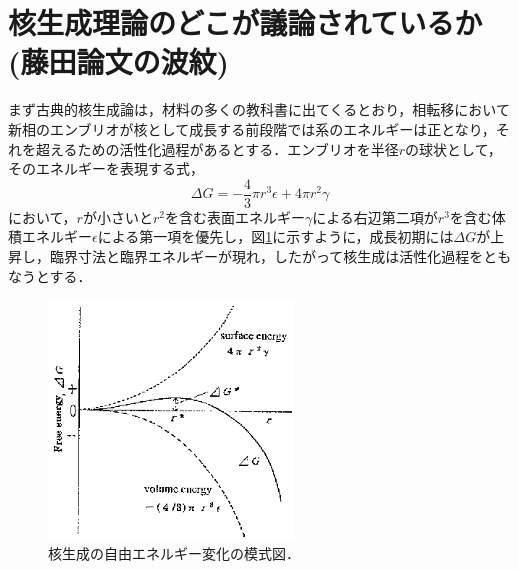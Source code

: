 \documentclass[a4j,10pt]{jarticle}
\begin{document}
\section{核生成理論のどこが議論されているか(藤田論文の波紋)}
まず古典的核生成論は，材料の多くの教科書に出てくるとおり，相転移において新相のエンブリオが核として成長する前段階では系のエネルギーは正となり，それを超えるための活性化過程があるとする．エンブリオを半径$r$の球状として，そのエネルギーを表現する式，
\begin{equation}
\Delta G = -\frac{4}{3}\pi r^3 \epsilon + 4 \pi r^2 \gamma
\label{Eq:1}
\end{equation}
において，$r$が小さいと$r^2$を含む表面エネルギー$\gamma$による右辺第二項が$r^3$を含む体積エネルギー$\epsilon$による第一項を優先し，図\ref{NucleationFreeE}に示すように，成長初期には$\Delta G$が上昇し，臨界寸法と臨界エネルギーが現れ，したがって核生成は活性化過程をともなうとする．
\begin{figure}[ht]\begin{center}
\includegraphics[width=65mm]{./figs/NucleationFreeE.eps}
\caption{核生成の自由エネルギー変化の模式図．}
\label{NucleationFreeE}
\end{center}\end{figure}
\end{document}
